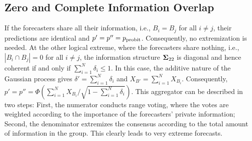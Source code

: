 \documentclass[12pt]{article}
\theoremstyle{definition}
\theoremstyle{definition}
\def\probit{p_{\rm probit}}
\begin{document}
\subsection{Zero and Complete Information Overlap}
\label{disjoint}
If the forecasters share all their information, i.e.,   $B_{i} = B_j$ for all $i \neq j$,  their predictions are identical and $p' = p'' = \probit$.
Consequently, no
extremization is needed. At the other logical extreme, where the forecasters share nothing, i.e.,  $|B_{i} \cap B_{j}| = 0$ for all $i \neq j$,
the information structure ${\bf\Sigma}_{22}$ is
diagonal and hence coherent if and only if $\sum_{i=1}^N \delta_i
\leq 1$. In this case, the additive nature of the Gaussian process gives $\delta' = \sum_{i=1}^N \delta_i$ and $X_{B'} = \sum_{i=1}^N X_{B_i}$. Consequently,
$p' = p'' =  \Phi\left(\sum_{i=1}^N X_{B_i} \big/ \sqrt{1- \sum_{i=1}^N \delta_i} \right)$. This aggregator can be described in two steps: First, the numerator conducts range voting,
 where the votes are weighted according to
the importance of the forecasters' private information;
Second, the
denominator extremizes the consensus according to the total
amount of information in the group. 
This clearly leads to very extreme forecasts. 


\end{document}
